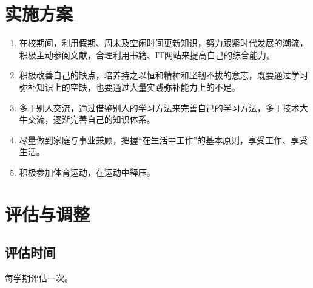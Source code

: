\documentclass{article}
\begin{document}
\begin{enumerate}[1.]
\section{实施方案}
\begin{enumerate}[1、]
	\item 在校期间，利用假期、周末及空闲时间更新知识，努力跟紧时代发展的潮流，积极主动参阅文献，合理利用书籍、IT网站来提高自己的综合能力。
	\item 积极改善自己的缺点，培养持之以恒和精神和坚韧不拔的意志，既要通过学习弥补知识上的空缺，也要通过大量实践弥补能力上的不足。
	\item 多于别人交流，通过借鉴别人的学习方法来完善自己的学习方法，多于技术大牛交流，逐渐完善自己的知识体系。
	\item 尽量做到家庭与事业兼顾，把握“在生活中工作”的基本原则，享受工作、享受生活。
	\item 积极参加体育运动，在运动中释压。
\end{enumerate}
\par  

\section{评估与调整}
\subsection{评估时间}
每学期评估一次。\par

\end{enumerate}
\end{document}
